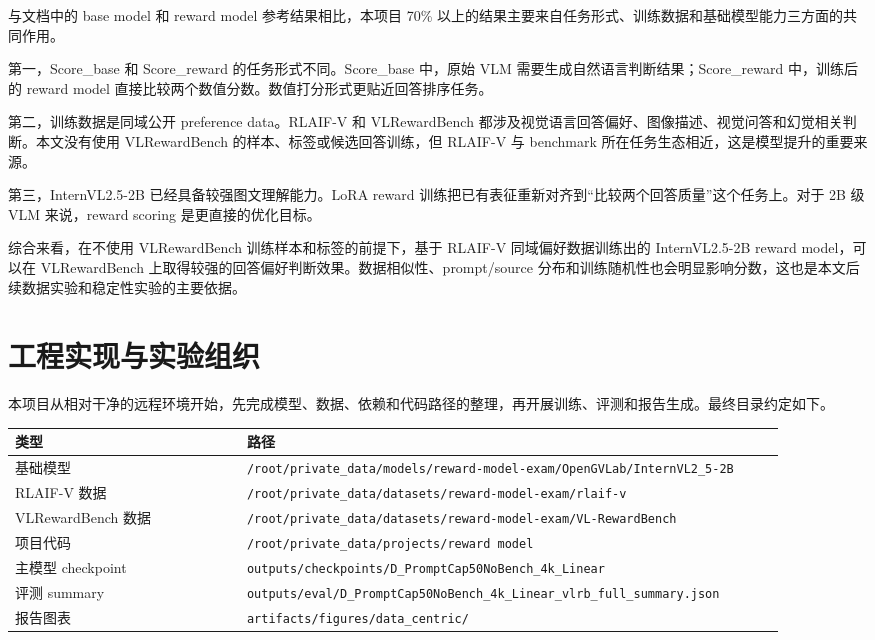\documentclass[11pt,a4paper]{ctexart}
\begin{document}
与文档中的 base model 和 reward model 参考结果相比，本项目 70\% 以上的结果主要来自任务形式、训练数据和基础模型能力三方面的共同作用。

第一，Score\_base 和 Score\_reward 的任务形式不同。Score\_base 中，原始 VLM 需要生成自然语言判断结果；Score\_reward 中，训练后的 reward model 直接比较两个数值分数。数值打分形式更贴近回答排序任务。

第二，训练数据是同域公开 preference data。RLAIF-V 和 VLRewardBench 都涉及视觉语言回答偏好、图像描述、视觉问答和幻觉相关判断。本文没有使用 VLRewardBench 的样本、标签或候选回答训练，但 RLAIF-V 与 benchmark 所在任务生态相近，这是模型提升的重要来源。

第三，InternVL2.5-2B 已经具备较强图文理解能力。LoRA reward 训练把已有表征重新对齐到“比较两个回答质量”这个任务上。对于 2B 级 VLM 来说，reward scoring 是更直接的优化目标。

综合来看，在不使用 VLRewardBench 训练样本和标签的前提下，基于 RLAIF-V 同域偏好数据训练出的 InternVL2.5-2B reward model，可以在 VLRewardBench 上取得较强的回答偏好判断效果。数据相似性、prompt/source 分布和训练随机性也会明显影响分数，这也是本文后续数据实验和稳定性实验的主要依据。

\section{工程实现与实验组织}

本项目从相对干净的远程环境开始，先完成模型、数据、依赖和代码路径的整理，再开展训练、评测和报告生成。最终目录约定如下。

\begin{center}\small
\begin{longtable}{p{0.29\linewidth} p{0.65\linewidth}}
\toprule
类型 & 路径 \\
\midrule
基础模型 & \texttt{/root/private\_data/models/reward-model-exam/OpenGVLab/InternVL2\_5-2B} \\
RLAIF-V 数据 & \texttt{/root/private\_data/datasets/reward-model-exam/rlaif-v} \\
VLRewardBench 数据 & \texttt{/root/private\_data/datasets/reward-model-exam/VL-RewardBench} \\
项目代码 & \texttt{/root/private\_data/projects/reward model} \\
主模型 checkpoint & \texttt{outputs/checkpoints/D\_PromptCap50NoBench\_4k\_Linear} \\
评测 summary & \texttt{outputs/eval/D\_PromptCap50NoBench\_4k\_Linear\_vlrb\_full\_summary.json} \\
报告图表 & \texttt{artifacts/figures/data\_centric/} \\
\bottomrule
\end{longtable}\end{center}
\end{document}
